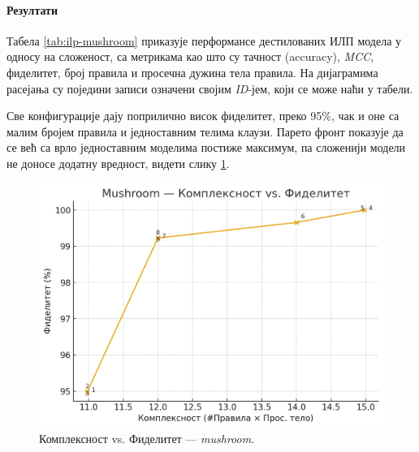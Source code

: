 \paragraph{Резултати} Табела \ref{tab:ilp-mushroom} приказује перформансе дестилованих ИЛП модела у односу на сложеност, са метрикама као што су тачност (accuracy), \textit{MCC}, фиделитет, број правила и просечна дужина тела правила. На дијаграмима расејања су поједини записи означени својим \emph{ID}-јем, који се може наћи у табели.

Све конфигурације дају поприлично висок фиделитет, преко 95\%, чак и оне са малим бројем правила и једноставним телима клаузи. Парето фронт показује да се већ са врло једноставним моделима постиже максимум, па сложенији модели не доносе додатну вредност, видети слику \ref{fig:mush-complexity-fidelity}.
\begin{figure}[H]
  \centering
  \includegraphics[width=.85\linewidth]{images/charts/mushroom-kompleksnost-fidelitet.png}
  \caption{Комплексност vs. Фиделитет — \textit{mushroom}.}
  \label{fig:mush-complexity-fidelity}
\end{figure}

